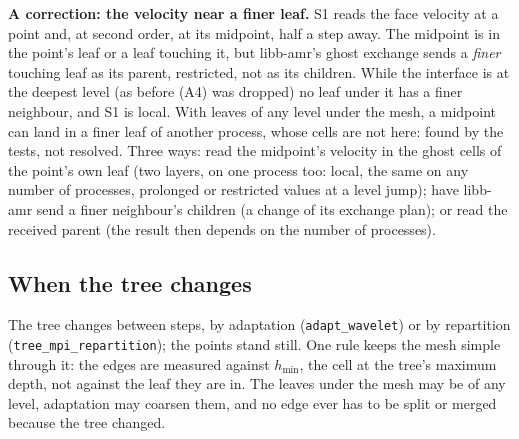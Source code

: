 \documentclass[10pt,a4paper]{article}
\theoremstyle{definition}
\newcommand{\fn}[1]{\texttt{#1}}
\begin{document}
\textbf{A correction: the velocity near a finer leaf.} S1 reads the face
velocity at a point and, at second order, at its midpoint, half a step
away. The midpoint is in the point's leaf or a leaf touching it, but
libb-amr's ghost exchange sends a \emph{finer} touching leaf as its
parent, restricted, not as its children. While the interface is at the
deepest level (as before (A4) was dropped) no leaf under it has a finer
neighbour, and S1 is local. With leaves of any level under the mesh, a
midpoint can land in a finer leaf of another process, whose cells are not
here: found by the tests, not resolved. Three ways: read the midpoint's
velocity in the ghost cells of the point's own leaf (two layers, on one
process too: local, the same on any number of processes, prolonged or
restricted values at a level jump); have libb-amr send a finer
neighbour's children (a change of its exchange plan); or read the
received parent (the result then depends on the number of processes).

\subsection{When the tree changes}
\label{sec:part-tree}

The tree changes between steps, by adaptation (\fn{adapt\_wavelet}) or by
repartition (\fn{tree\_mpi\_repartition}); the points stand still. One
rule keeps the mesh simple through it: the edges are measured against
$h_{\min}$, the cell at the tree's maximum depth, not against the leaf
they are in. The leaves under the mesh may be of any level, adaptation
may coarsen them, and no edge ever has to be split or merged because the
tree changed.
\end{document}

